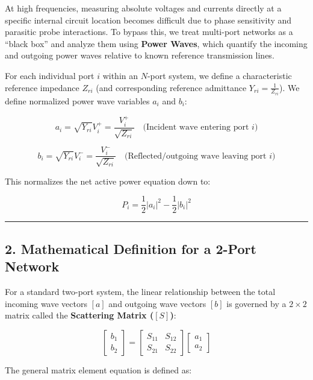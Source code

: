 \documentclass[
]{article}
\begin{document}
At high frequencies, measuring absolute voltages and currents directly
at a specific internal circuit location becomes difficult due to phase
sensitivity and parasitic probe interactions. To bypass this, we treat
multi-port networks as a ``black box'' and analyze them using
\textbf{Power Waves}, which quantify the incoming and outgoing power
waves relative to known reference transmission lines.

For each individual port \(i\) within an \(N\)-port system, we define a
characteristic reference impedance \(Z_{ri}\) (and corresponding
reference admittance \(Y_{ri} = \frac{1}{Z_{ri}}\)). We define
normalized power wave variables \(a_i\) and \(b_i\):

\[a_i = \sqrt{Y_{ri}} V_i^+ = \frac{V_i^+}{\sqrt{Z_{ri}}} \quad \text{(Incident wave entering port } i\text{)}\]

\[b_i = \sqrt{Y_{ri}} V_i^- = \frac{V_i^-}{\sqrt{Z_{ri}}} \quad \text{(Reflected/outgoing wave leaving port } i\text{)}\]

This normalizes the net active power equation down to:

\[P_i = \frac{1}{2} |a_i|^2 - \frac{1}{2} |b_i|^2\]

\begin{center}\rule{0.5\linewidth}{0.5pt}\end{center}

\subsection{2. Mathematical Definition for a 2-Port
Network}\label{mathematical-definition-for-a-2-port-network}

For a standard two-port system, the linear relationship between the
total incoming wave vectors \([a]\) and outgoing wave vectors \([b]\) is
governed by a \(2 \times 2\) matrix called the \textbf{Scattering Matrix
(\([S]\))}:

\[\begin{bmatrix} b_1 \\ b_2 \end{bmatrix} = \begin{bmatrix} S_{11} & S_{12} \\ S_{21} & S_{22} \end{bmatrix} \begin{bmatrix} a_1 \\ a_2 \end{bmatrix}\]

The general matrix element equation is defined as:
\end{document}
